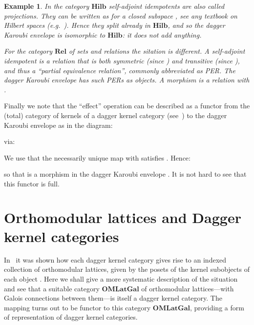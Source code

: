 \documentclass{article}
\newif\ifignore \ignorefalse
\newcommand{\auxproof}[1]{
\ifignore\mbox{}\newline
\textbf{PROOF:} \dotfill\newline
{\it #1}\mbox{}\newline
\textbf{ENDPROOF}\dotfill
\fi}
\newtheorem{example}[theorem]{Example}
\newcommand{\Cat}[1]{\ensuremath{\mathbf{#1}}}
\newcommand{\Rel}{\Cat{Rel}\xspace}
\newcommand{\Hilb}{\Cat{Hilb}\xspace}
\begin{document}
\begin{example}
\label{KaroubiKernelEx}
In the category \Hilb self-adjoint idempotents  are also called projections. They can be written as  for a closed subspace , see any textbook on Hilbert spaces
(\textit{e.g.}~\cite{Dvurecenskij92}). Hence they split already in
\Hilb, and so the dagger Karoubi envelope  is
isomorphic to \Hilb: it does not add anything.

For the category \Rel of sets and relations the sitation is different.
A self-adjoint idempotent  is a relation
 that is both symmetric (since )
and transitive (since ), and thus a ``partial
equivalence relation'', commonly abbreviated as PER. The dagger
Karoubi envelope  has such PERs as objects. A
morphism  is a relation  with .  



\end{example}


Finally we note that the ``effect'' operation  can be described as a functor from the (total) category
 of kernels of a dagger kernel category
(see~\cite{HeunenJ09a}) to the dagger Karoubi envelope
 as in the diagram:


\noindent via:


\noindent We use that the necessarily unique map  with  satisfies
.
Hence:


\noindent so that  is a morphism  in the dagger Karoubi envelope . It
is not hard to see that this functor is full.

\auxproof{
We check functoriality:


\noindent As to fulness, assume  in . Taking  we get:


\noindent Hence  is a map  in .
It is mapped to itself: .
}



\section{Orthomodular lattices and Dagger kernel categories}\label{OMLatDagKerSec}

In~\cite{HeunenJ09a} it was shown how each dagger kernel category
gives rise to an indexed collection of orthomodular lattices, given by
the posets of the kernel subobjects  of each object
. Here we shall give a more systematic description of the situation
and see that a suitable category \Cat{OMLatGal} of orthomodular
lattices---with Galois connections between them---is itself a dagger
kernel category.  The mapping  turns out to be functor to
this category \Cat{OMLatGal}, providing a form of representation of
dagger kernel categories.
\end{document}
